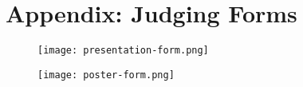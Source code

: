 \section{Appendix: Judging Forms}

\begin{figure}[H]
	\centering
	\texttt{[image: presentation-form.png]}
\end{figure}
\newpage
\begin{figure}[H]
	\centering
	\texttt{[image: poster-form.png]}
\end{figure}